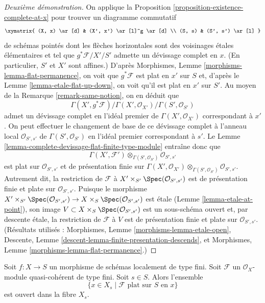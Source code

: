 \begin{proof}[Deuxième démonstration]
On applique la
Proposition \ref{proposition-existence-complete-at-x}
pour trouver un diagramme commutatif
$$
\xymatrix{
(X, x) \ar[d] & (X', x') \ar[l]^g \ar[d] \\
(S, s) & (S', s') \ar[l]
}
$$
de schémas pointés dont les flèches
horizontales sont des voisinages \'etales élémentaires
et tel que $g^*\mathcal{F}/X'/S'$ admette un
d\'evissage complet en $x$.
(En particulier, $S'$ et $X'$ sont affines.) D'après
Morphismes, Lemme \ref{morphisms-lemma-flat-permanence},
on voit que $g^*\mathcal{F}$ est plat en $x'$ sur $S$ et, d'après le
Lemme \ref{lemma-etale-flat-up-down},
on voit qu'il est plat en $x'$ sur $S'$. Au moyen de la
Remarque \ref{remark-same-notion},
on en déduit que
$$
\Gamma(X', g^*\mathcal{F})/
\Gamma(X', \mathcal{O}_{X'})/
\Gamma(S', \mathcal{O}_{S'})
$$
admet un d\'evissage complet en l'idéal premier de $\Gamma(X', \mathcal{O}_{X'})$
correspondant à $x'$. On peut effectuer le changement de base de ce
d\'evissage complet à l'anneau local $\mathcal{O}_{S', s'}$
de $\Gamma(S', \mathcal{O}_{S'})$ en l'idéal premier correspondant à
$s'$. Le
Lemme \ref{lemma-complete-devissage-flat-finite-type-module}
entraîne donc que
$$
\Gamma(X', \mathcal{F}')
\otimes_{\Gamma(S', \mathcal{O}_{S'})}
\mathcal{O}_{S', s'}
$$
est plat sur $\mathcal{O}_{S', s'}$ et de présentation finie sur
$\Gamma(X', \mathcal{O}_{X'})
\otimes_{\Gamma(S', \mathcal{O}_{S'})} \mathcal{O}_{S', s'}$.
Autrement dit, la restriction de $\mathcal{F}$ à
$X' \times_{S'} \Spec(\mathcal{O}_{S', s'})$
est de présentation finie et plate sur $\mathcal{O}_{S', s'}$.
Puisque le morphisme
$X' \times_{S'} \Spec(\mathcal{O}_{S', s'})
\to X \times_S \Spec(\mathcal{O}_{S', s'})$
est \'etale
(Lemme \ref{lemma-etale-at-point}),
son image $V \subset X \times_S \Spec(\mathcal{O}_{S', s'})$
est un sous-schéma ouvert et, par descente \'etale, la restriction
de $\mathcal{F}$ à $V$ est de présentation finie et plate sur
$\mathcal{O}_{S', s'}$. (Résultats utilisés :
Morphismes, Lemme \ref{morphisms-lemma-etale-open},
Descente, Lemme \ref{descent-lemma-finite-presentation-descends}, et
Morphismes, Lemme \ref{morphisms-lemma-flat-permanence}.)
\end{proof}

\begin{lemma}
\label{lemma-open-in-fibre-where-flat}
Soit $f : X \to S$ un morphisme de schémas localement de type fini.
Soit $\mathcal{F}$ un $\mathcal{O}_X$-module quasi-cohérent de type fini.
Soit $s \in S$. Alors l'ensemble
$$
\{x \in X_s \mid \mathcal{F} \text{ plat sur }S\text{ en }x\}
$$
est ouvert dans la fibre $X_s$.
\end{lemma}

